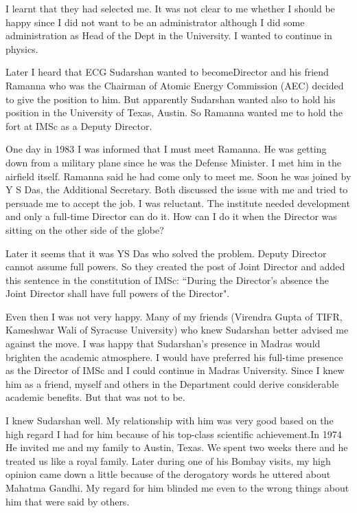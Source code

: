 I learnt that they had selected me. It was not clear to me whether I 
should be happy since I did not want to be an admini\-strator although I 
did some administration as Head of the Dept in the University. I wanted 
to continue in physics.

Later I heard that ECG Sudarshan wanted to become\break Director and his 
friend Ramanna who was the Chairman of Atomic Energy Commission (AEC) 
decided to give the position to him. But apparently Sudarshan wanted 
also to hold his position in the University of Texas, Austin. So Ramanna 
wanted me to hold the fort at IMSc as a Deputy Director.

One day in 1983 I was informed that I must meet Ramanna. He was getting 
down from a military plane since he was the Defense Minister. I met him 
in the airfield itself. Ramanna said he had come only to meet me. Soon 
he was joined by Y S Das, the Additional Secretary. Both discussed the 
issue with me and tried to persuade me to accept the job. I was 
reluctant. The institute needed development and only a full-time 
Director can do it. How can I do it when the Director was sitting on the 
other side of the globe?

Later it seems that it was YS Das who solved the problem. Deputy 
Director cannot assume full powers. So they created the post of Joint 
Director and added this sentence in the constitution of IMSc: ``During 
the Director's absence the Joint Director shall have full powers of the 
Director".

Even then I was not very happy. Many of my friends (Virendra Gupta of 
TIFR, Kameshwar Wali of Syracuse University) who knew Sudarshan better 
advised me against the move. I was happy that Sudarshan's presence in 
Madras would brighten the academic atmosphere. I would have preferred 
his full-time presence as the Director of IMSc and I could continue in 
Madras University. Since I knew him as a friend, myself and others in 
the Department could derive considerable academic benefits. But that was 
not to be.

I knew Sudarshan well. My relationship with him was very good based on 
the high regard I had for him because of his top-class scientific 
achievement.In 1974 He invited me and my family to Austin, Texas. We 
spent two weeks there and he treated us like a royal family. Later 
during one of his Bombay visits, my high opinion came down a little 
because of the derogatory words he uttered about Mahatma Gandhi. My 
regard for him blinded me even to the wrong things about him that were 
said by others.

